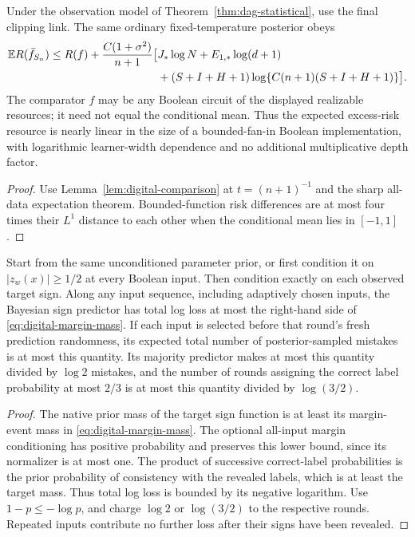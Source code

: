 \begin{corollary}
\label{cor:digital-oracle}
Under the observation model of Theorem~\ref{thm:dag-statistical}, use the final clipping link. The same ordinary fixed-temperature posterior obeys
\begin{align*}
 \mathbb E R(\bar f_{S_n})\le R(f)+\frac{C(1+\sigma^2)}{n+1}
 \big[&J_*\log N+E_{1,*}\log(d+1)\\
 &+(S+I+H+1)\log\{C(n+1)(S+I+H+1)\}\big].
\end{align*}
The comparator $f$ may be any Boolean circuit of the displayed realizable resources; it need not equal the conditional mean. Thus the expected excess-risk resource is nearly linear in the size of a bounded-fan-in Boolean implementation, with logarithmic learner-width dependence and no additional multiplicative depth factor.
\end{corollary}
\begin{proof}
Use Lemma~\ref{lem:digital-comparison} at $t=(n+1)^{-1}$ and the sharp all-data expectation theorem. Bounded-function risk differences are at most four times their $L^1$ distance to each other when the conditional mean lies in $[-1,1]$.
\end{proof}

\begin{corollary}
Start from the same unconditioned parameter prior, or first condition it on $|z_w(x)|\ge1/2$ at every Boolean input. Then condition exactly on each observed target sign. Along any input sequence, including adaptively chosen inputs, the Bayesian sign predictor has total log loss at most the right-hand side of \eqref{eq:digital-margin-mass}. If each input is selected before that round's fresh prediction randomness, its expected total number of posterior-sampled mistakes is at most this quantity. Its majority predictor makes at most this quantity divided by $\log2$ mistakes, and the number of rounds assigning the correct label probability at most $2/3$ is at most this quantity divided by $\log(3/2)$.
\end{corollary}
\begin{proof}
The native prior mass of the target sign function is at least its margin-event mass in \eqref{eq:digital-margin-mass}. The optional all-input margin conditioning has positive probability and preserves this lower bound, since its normalizer is at most one. The product of successive correct-label probabilities is the prior probability of consistency with the revealed labels, which is at least the target mass. Thus total log loss is bounded by its negative logarithm. Use $1-p\le-\log p$, and charge $\log2$ or $\log(3/2)$ to the respective rounds. Repeated inputs contribute no further loss after their signs have been revealed.
\end{proof}
